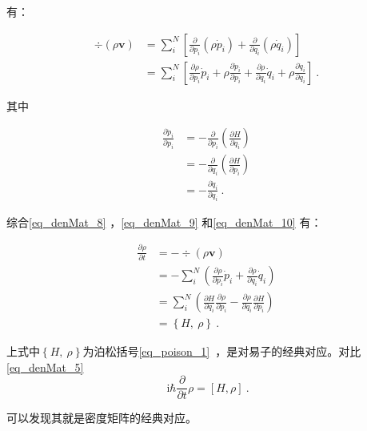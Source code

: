 有：

\begin{equation}\label{eq_denMat_9}
\begin{aligned}
\div\left(\rho\mathbf{v}\right)&= \sum_i^N\left[
    \frac{\partial}{\partial p_i}\left( \rho \dot{p}_i \right) + 
    \frac{\partial}{\partial q_i}\left( \rho \dot{q}_i \right)
    \right] \\
&=\sum_i^N\left[
    \frac{\partial\rho}{\partial p_i}\dot{p}_i +
    \rho \frac{\partial \dot{p}_i}{\partial p_i} +
    \frac{\partial\rho}{\partial q_i}\dot{q}_i +
    \rho \frac{\partial \dot{q}_i}{\partial q_i}
    \right]~.
\end{aligned}~
\end{equation}

其中

\begin{equation}\label{eq_denMat_10}
\begin{aligned}
\frac{\partial \dot{p}_i}{\partial p_i} 
&= -\frac{\partial}{\partial p_i}\left(\frac{\partial H}{\partial q_i}\right) \\
&= -\frac{\partial}{\partial q_i}\left(\frac{\partial H}{\partial p_i}\right) \\
&= -\frac{\partial \dot{q}_i}{\partial q_i}~.
\end{aligned}~
\end{equation}

综合\autoref{eq_denMat_8} ，\autoref{eq_denMat_9} 和\autoref{eq_denMat_10} 有：

\begin{equation}
\begin{aligned}
\frac{\partial \rho}{\partial t}&=-\div \left(\rho \mathbf{v}\right) \\
&= - \sum_i^N\left(\frac{\partial \rho}{\partial p_i}\dot{p}_i + \frac{\partial \rho}{\partial q_i}\dot{q}_i\right)\\
&= \sum_i^N\left(\frac{\partial H}{\partial q_i}\frac{\partial \rho}{\partial p_i} - \frac{\partial \rho}{\partial q_i}\frac{\partial H}{\partial p_i}\right) \\
&= \left\{H,~\rho\right\}~.
\end{aligned}~
\end{equation}

上式中$\left\{H,~\rho\right\}$为泊松括号\autoref{eq_poison_1}~，是对易子的经典对应。对比\autoref{eq_denMat_5} 
$$\mathrm{i}\hbar \frac{\partial}{\partial t} \rho= \left[ H, \rho \right]~.$$

可以发现其就是密度矩阵的经典对应。


